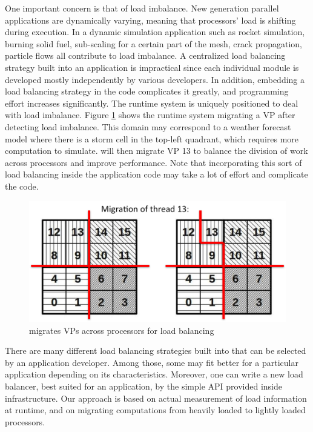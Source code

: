 \documentclass[10pt]{article}
\begin{document}
One important concern is that of load imbalance. New generation parallel
applications are dynamically varying, meaning that processors' load is
shifting during execution. In a dynamic simulation application such as
rocket simulation, burning solid fuel, sub-scaling for a certain part of
the mesh, crack propagation, particle flows all contribute to load imbalance.
A centralized load balancing strategy built into an application is
impractical since each individual module is developed mostly independently by
various developers. In addition, embedding a load balancing strategy in the code
complicates it greatly, and programming effort increases significantly. The
runtime system is uniquely positioned to deal with load imbalance. Figure
\ref{fig_migrate} shows the runtime system migrating a VP after detecting
load imbalance. This domain may correspond to a weather forecast model
where there is a storm cell in the top-left quadrant, which requires more
computation to simulate. \ampi{} will then migrate VP 13 to balance the
division of work across processors and improve performance. Note that
incorporating this sort of load balancing inside the application code may
take a lot of effort and complicate the code.

\begin{figure}[h]
\centering
\includegraphics[width=4.6in]{figs/migrate.png}
\caption{\ampi{} migrates VPs across processors for load balancing}
\label{fig_migrate}
\end{figure}

There are many different load balancing strategies built into \charmpp{} that
can be selected by an \ampi{} application developer. Among those, some may
fit better for a particular application depending on its characteristics.
Moreover, one can write a new load balancer, best suited for an application,
by the simple API provided inside \charmpp{} infrastructure.
Our approach is based on actual measurement of load information at runtime,
and on migrating computations from heavily loaded to lightly loaded processors.
\end{document}

